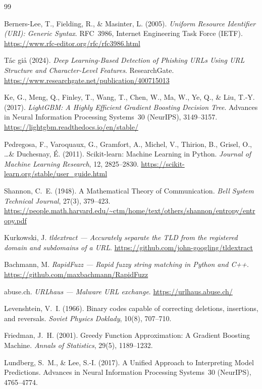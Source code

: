 \documentclass[a4paper,12pt]{article}
\begin{document}
\newpage
\begin{thebibliography}{99}

Berners-Lee, T., Fielding, R., \& Masinter, L. (2005).
\textit{Uniform Resource Identifier (URI): Generic Syntax}.
RFC~3986, Internet Engineering Task Force (IETF).
\url{https://www.rfc-editor.org/rfc/rfc3986.html}

Tác giả (2024).
\textit{Deep Learning-Based Detection of Phishing URLs Using URL Structure and Character-Level Features}.
ResearchGate.
\url{https://www.researchgate.net/publication/400715013}

Ke, G., Meng, Q., Finley, T., Wang, T., Chen, W., Ma, W., Ye, Q., \& Liu, T.-Y. (2017).
\textit{LightGBM: A Highly Efficient Gradient Boosting Decision Tree}.
Advances in Neural Information Processing Systems~30 (NeurIPS), 3149--3157.
\url{https://lightgbm.readthedocs.io/en/stable/}

Pedregosa, F., Varoquaux, G., Gramfort, A., Michel, V., Thirion, B., Grisel, O., \ldots \& Duchesnay, \'E. (2011).
Scikit-learn: Machine Learning in Python.
\textit{Journal of Machine Learning Research}, 12, 2825--2830.
\url{https://scikit-learn.org/stable/user_guide.html}

Shannon, C.~E. (1948).
A Mathematical Theory of Communication.
\textit{Bell System Technical Journal}, 27(3), 379--423.
\url{https://people.math.harvard.edu/~ctm/home/text/others/shannon/entropy/entropy.pdf}

Kurkowski, J.
\textit{tldextract --- Accurately separate the TLD from the registered domain and subdomains of a URL}.
\url{https://github.com/john-googling/tldextract}

Bachmann, M.
\textit{RapidFuzz --- Rapid fuzzy string matching in Python and C++}.
\url{https://github.com/maxbachmann/RapidFuzz}

abuse.ch.
\textit{URLhaus --- Malware URL exchange}.
\url{https://urlhaus.abuse.ch/}

Levenshtein, V.~I. (1966).
Binary codes capable of correcting deletions, insertions, and reversals.
\textit{Soviet Physics Doklady}, 10(8), 707--710.

Friedman, J.~H. (2001).
Greedy Function Approximation: A Gradient Boosting Machine.
\textit{Annals of Statistics}, 29(5), 1189--1232.

Lundberg, S.~M., \& Lee, S.-I. (2017).
A Unified Approach to Interpreting Model Predictions.
Advances in Neural Information Processing Systems~30 (NeurIPS), 4765--4774.

\end{thebibliography}
\end{document}
